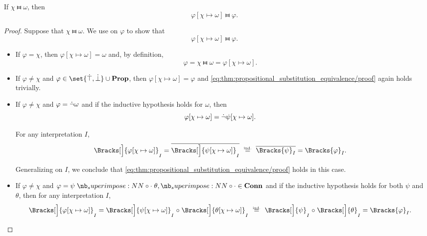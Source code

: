 \begin{proposition}\label{thm:propositional_substitution_equivalence}
  If \( \chi \gleichstark \omega \), then
  \begin{equation*}
    \varphi[\chi \mapsto \omega] \gleichstark \varphi.
  \end{equation*}
\end{proposition}
\begin{proof}
  Suppose that \( \chi \gleichstark \omega \). We use  on \( \varphi \) to show that
  \begin{equation}\label{eq:thm:propositional_substitution_equivalence/proof}
    \varphi[\chi \mapsto \omega] \gleichstark \varphi.
  \end{equation}

  \begin{itemize}
    \item If \( \varphi = \chi \), then \( \varphi[\chi \mapsto \omega] = \omega \) and, by definition,
    \begin{equation*}
      \varphi = \chi \gleichstark \omega = \varphi[\chi \mapsto \omega].
    \end{equation*}

    \item If \( \varphi \neq \chi \) and \( \varphi \in \set{ \syntop, \synbot } \cup \op*{Prop} \), then \( \varphi[\chi \mapsto \omega] = \varphi \) and \eqref{eq:thm:propositional_substitution_equivalence/proof} again holds trivially.

    \item If \( \varphi \neq \chi \) and \( \varphi = \dot\neg \omega \) and if the inductive hypothesis holds for \( \omega \), then
    \begin{equation*}
      \varphi[\chi \mapsto \omega] = \dot\neg \psi[\chi \mapsto \omega].
    \end{equation*}

    For any interpretation \( I \),
    \begin{equation*}
      \Bracks[\Big]{ \varphi[\chi \mapsto \omega] }_I
      =
      \oline{\Bracks[\Big]{\psi[\chi \mapsto \omega] }_I}
      \reloset {\T{ind.}} =
      \oline{\Bracks{\psi}_I}
      =
      \Bracks{\varphi}_I.
    \end{equation*}

    Generalizing on \( I \), we conclude that \eqref{eq:thm:propositional_substitution_equivalence/proof} holds in this case.

    \item If \( \varphi \neq \chi \) and \( \varphi = \psi \syncirc \theta, {\syncirc} \in \op*{Conn} \) and if the inductive hypothesis holds for both \( \psi \) and \( \theta \), then for any interpretation \( I \),
    \begin{equation*}
      \Bracks[\Big]{ \varphi[\chi \mapsto \omega] }_I
      =
      \Bracks[\Big]{ \psi[\chi \mapsto \omega] }_I \relcirc \Bracks[\Big]{ \theta[\chi \mapsto \omega] }_I
      \reloset {\T{ind.}} =
      \Bracks[\Big]{\psi}_I \relcirc \Bracks[\Big]{\theta}_I
      =
      \Bracks{\varphi}_I.
    \end{equation*}


\end{itemize}
\end{proof}
